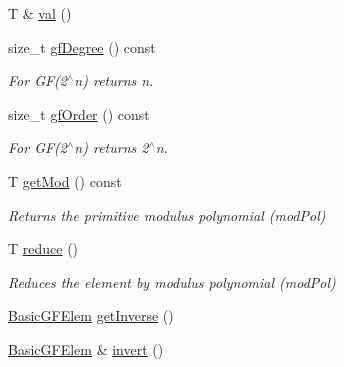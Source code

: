 \begin{DoxyCompactItemize}
T \& \mbox{\hyperlink{class_g_flinalg_1_1_basic_g_f_elem_aac981dfbea7fe6c43117f26e2dcaf50c}{val}} ()
\item 
\mbox{\label{class_g_flinalg_1_1_basic_g_f_elem_a21d72ed4e314fc8ce181c39c0dee64ba}} 
size\+\_\+t \mbox{\hyperlink{class_g_flinalg_1_1_basic_g_f_elem_a21d72ed4e314fc8ce181c39c0dee64ba}{gf\+Degree}} () const
\begin{DoxyCompactList}\small\item\em For G\+F(2$^\wedge$n) returns n. \end{DoxyCompactList}\item 
\mbox{\label{class_g_flinalg_1_1_basic_g_f_elem_a9907d5f6c701cac0f9605911fdedfb47}} 
size\+\_\+t \mbox{\hyperlink{class_g_flinalg_1_1_basic_g_f_elem_a9907d5f6c701cac0f9605911fdedfb47}{gf\+Order}} () const
\begin{DoxyCompactList}\small\item\em For G\+F(2$^\wedge$n) returns 2$^\wedge$n. \end{DoxyCompactList}\item 
\mbox{\label{class_g_flinalg_1_1_basic_g_f_elem_a153f3bc677988974fafeada178395ba8}} 
T \mbox{\hyperlink{class_g_flinalg_1_1_basic_g_f_elem_a153f3bc677988974fafeada178395ba8}{get\+Mod}} () const
\begin{DoxyCompactList}\small\item\em Returns the primitive modulus polynomial (mod\+Pol) \end{DoxyCompactList}\item 
\mbox{\label{class_g_flinalg_1_1_basic_g_f_elem_a034dcc1f25fac4c69597d4720c3853b3}} 
T \mbox{\hyperlink{class_g_flinalg_1_1_basic_g_f_elem_a034dcc1f25fac4c69597d4720c3853b3}{reduce}} ()
\begin{DoxyCompactList}\small\item\em Reduces the element by modulus polynomial (mod\+Pol) \end{DoxyCompactList}\item 
\mbox{\hyperlink{class_g_flinalg_1_1_basic_g_f_elem}{Basic\+G\+F\+Elem}} \mbox{\hyperlink{class_g_flinalg_1_1_basic_g_f_elem_a9b6a0288a351bdf2127ba322726cf281}{get\+Inverse}} ()
\item 
\mbox{\hyperlink{class_g_flinalg_1_1_basic_g_f_elem}{Basic\+G\+F\+Elem}} \& \mbox{\hyperlink{class_g_flinalg_1_1_basic_g_f_elem_a9e3eeb4bfa609121887f67b229988a46}{invert}} ()

\end{DoxyCompactItemize}
